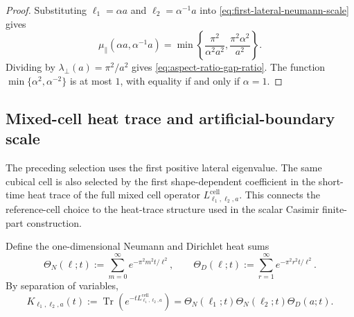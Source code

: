 \documentclass[11pt]{article}
\newcommand{\Tr}{\operatorname{Tr}}
\begin{document}
\begin{proof}
Substituting
\(\ell_1=\alpha a\) and \(\ell_2=\alpha^{-1}a\) into
\eqref{eq:first-lateral-neumann-scale} gives
\[
    \mu_\parallel(\alpha a,\alpha^{-1}a)
    =
    \min\left\{
        \frac{\pi^2}{\alpha^2a^2},
        \frac{\pi^2\alpha^2}{a^2}
    \right\}.
\]
Dividing by \(\lambda_\perp(a)=\pi^2/a^2\) gives
\eqref{eq:aspect-ratio-gap-ratio}.  The function
\(\min\{\alpha^2,\alpha^{-2}\}\) is at most \(1\), with equality if and only
if \(\alpha=1\).
\end{proof}

\subsection{Mixed-cell heat trace and artificial-boundary scale}
\label{sec:mixed-cell-heat-trace}

The preceding selection uses the first positive lateral eigenvalue.  The
same cubical cell is also selected by the first shape-dependent coefficient
in the short-time heat trace of the full mixed cell operator
\(L_{\ell_1,\ell_2,a}^{\mathrm{cell}}\).  This connects the reference-cell
choice to the heat-trace structure used in the scalar Casimir finite-part
construction.

Define the one-dimensional Neumann and Dirichlet heat sums
\begin{equation}
    \Theta_N(\ell;t)
    :=
    \sum_{m=0}^{\infty}
    e^{-\pi^2m^2t/\ell^2},
    \qquad
    \Theta_D(\ell;t)
    :=
    \sum_{r=1}^{\infty}
    e^{-\pi^2r^2t/\ell^2}.
    \label{eq:theta-ND-definitions}
\end{equation}
By separation of variables,
\begin{equation}
    K_{\ell_1,\ell_2,a}(t)
    :=
    \Tr\!\left(e^{-tL_{\ell_1,\ell_2,a}^{\mathrm{cell}}}\right)
    =
    \Theta_N(\ell_1;t)\Theta_N(\ell_2;t)\Theta_D(a;t).
    \label{eq:mixed-cell-heat-trace-factorization}
\end{equation}
\end{document}
